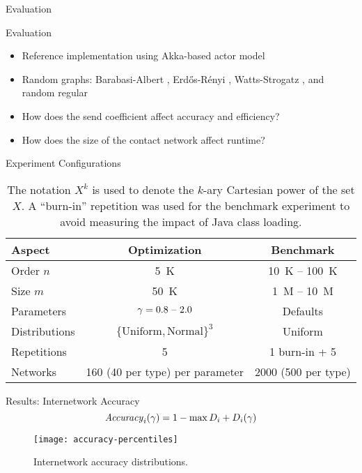 \documentclass[11pt]{beamer}
\begin{document}
\begin{section}{Evaluation}

\begin{frame}{Evaluation}
\begin{itemize}
  \item Reference implementation using Akka-based actor model
  \pause
  \item Random graphs: Barabasi-Albert \citep{Barabasi1999}, Erd\H{o}s-R\'{e}nyi \citep{Erdos1959}, Watts-Strogatz \citep{Watts1998}, and random regular \citep{Kim2003}
  \pause
  \item How does the send coefficient affect accuracy and efficiency?
  \pause
  \item How does the size of the contact network affect runtime?

\end{itemize}
\end{frame}

\begin{frame}{Experiment Configurations}
\begin{table}
  \centering
  \small
  \renewcommand{\arraystretch}{2}
  \begin{tabular}{lcc}
    \toprule
    Aspect & Optimization & Benchmark \\
    \midrule
    Order $n$ & \qty{5}{K} & \qty{10}{K} -- \qty{100}{K} \\
    Size $m$ & \qty{50}{K} & \qty{1}{M} -- \qty{10}{M} \\
    Parameters & $\gamma = \text{\num{0.8} -- \num{2.0}}$ & Defaults \\
    Distributions & $\{\text{Uniform}, \text{Normal}\}^3$ & Uniform \\
    Repetitions & \num{5} & \num{1} burn-in + \num{5} \\
    Networks & \num{160} (\num{40} per type) per parameter & \num{2000} (\num{500} per type) \\
    \bottomrule
  \end{tabular}
  \caption[Experiment configurations]{The notation $X^k$ is used to denote the $k$-ary Cartesian power of the set $X$. A ``burn-in'' repetition was used for the benchmark experiment to avoid measuring the impact of Java class loading.}
\end{table}
\end{frame}

\begin{frame}{Results: Internetwork Accuracy}
\begin{equation*}
  \mathit{Accuracy}_i(\gamma) = 1 - \max D_i + D_i(\gamma)
\end{equation*}
\begin{figure}
  \centering
  \texttt{[image: accuracy-percentiles]}
  \caption[Cumulative accuracy distributions]{Internetwork accuracy distributions.}
\end{figure}
\end{frame}


\end{section}
\end{document}
